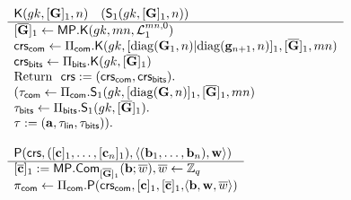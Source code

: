 \begin{figure}
\begin{\algSize}
$$
\begin{array}{l}
\begin{array}{l}
\algK(\gk,[\matr{G}]_1,n)\quad (\mathsf{S}_1(\gk,[\matr{G}]_1,n))\\
\hline
{[\overline{\matr{G}}]_1 \gets \MP.\algK(gk,mn,\distlin_1^{mn,0})}\\
\crs_\sfcom\gets\Pi_\sfcom.\algK(\gk,[\pdsum{\matr{G}_1}{n}\cat\pdsum{\vecb{g}_{n+1}}{n}]_1,[\ovG]_1, mn)\\
\crs_\sfbits\gets\Pi_\sfbits.\algK(\gk,[\overline{\matr{G}}]_1)\\
\text{Return } \ \mathsf{crs}:=(\crs_\sfcom,\crs_\sfbits).\\
(\tau_\sfcom\gets\Pi_\sfcom.\mathsf{S}_1(\gk,[\pdsum{\matr{G}}{n}]_1,[\ovG]_1,mn)\\
\tau_\sfbits\gets\Pi_\sfbits.\mathsf{S}_1(\gk,[\overline{\matr{G}}]_1).\\
\tau := (\vecb{a},\tau_\sflin,\tau_\sfbits)).\\
\\
\end{array}
\\
\begin{array}{l}
{\algP(\mathsf{crs}, ([\vecb{c}]_1,\ldots,[\vecb{c}_n]_1), \langle (\vecb{b}_1,\ldots,\vecb{b}_n), \vecb{w}\rangle)}\\
\hline
{[\ovecb{c}]_1 :=\MP.\Com_{[\ovG]_1}(\vecb{b};\overline{w})},\overline{w}\gets\Z_q\\
{\pi_\sfcom \gets \Pi_{\sfcom}.\algP(\crs_\sfcom,[\vecb{c}]_1,[\ovecb{c}]_1,}{\langle\vecb{b},\vecb{w},\overline{w}\rangle)}\\

\end{array}
\end{array}$$
\end{\algSize}
\end{figure}

